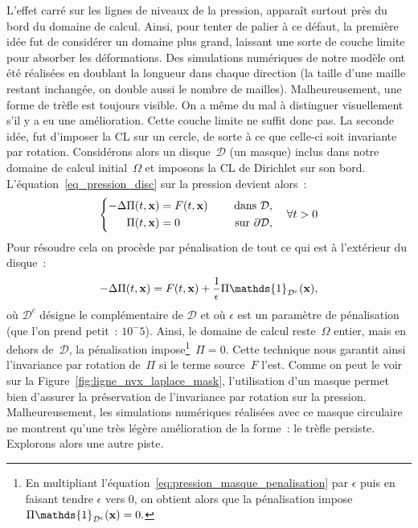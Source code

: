 \documentclass[main.tex]{subfiles}
\begin{document}
L'effet carré sur les lignes de niveaux de la pression, apparaît surtout près du bord du domaine de calcul. Ainsi, pour tenter de palier à ce défaut, la première idée fut de considérer un domaine plus grand, laissant une sorte de couche limite pour absorber les déformations. Des simulations numériques de notre modèle ont été réalisées en doublant la longueur dans chaque direction (la taille d'une maille restant inchangée, on double aussi le nombre de mailles). Malheureusement, une forme de trèfle est toujours visible. On a même du mal à distinguer visuellement s'il y a eu une amélioration. 
Cette couche limite ne suffit donc pas. 
La seconde idée, fut d'imposer la CL sur un cercle, de sorte à ce que celle-ci soit invariante par rotation. Considérons alors un disque~$\mathcal{D}$ (un masque) inclus dans notre domaine de calcul initial~$\Omega$ et imposons la CL de Dirichlet sur son bord. L'équation~\eqref{eq_pression_disc} sur la pression devient alors~: 
\begin{equation}\label{eq:pression_iter1_mask}
\left\{
\begin{aligned}
-\Delta \Pi(t,\mathbf{x}) &= F(t,\mathbf{x}) & \quad \textrm{ dans }  \mathcal{D} , \\
\Pi(t,\mathbf{x}) &=0 & \quad \textrm{ sur  } \partial\mathcal{D},
\end{aligned}
\right. \quad \forall t>0
\end{equation}
Pour résoudre cela on procède par pénalisation de tout ce qui est à l'extérieur du disque~:
\begin{equation}\label{eq:pression_masque_penalisation}
- \Delta \Pi(t,\vecx) = F(t,\vecx) + \frac{1}{\epsilon} \Pi \mathds{1}_{\mathcal{D}^c}(\vecx),
\end{equation}
où $\mathcal{D}^c$ désigne le complémentaire de $\mathcal{D}$ et où $\epsilon$ est un paramètre de pénalisation (que l'on prend petit~: $10^-5$). Ainsi, le domaine de calcul reste~$\Omega$ entier, mais en dehors de~$\mathcal{D}$, la pénalisation impose\footnote{En multipliant l'équation~\eqref{eq:pression_masque_penalisation} par $\epsilon$ puis en faisant tendre $\epsilon$ vers 0, on obtient alors que la pénalisation impose $\Pi \mathds{1}_{\mathcal{D}^c}(\vecx)=0.$}~$\Pi=0$. Cette technique nous garantit ainsi l'invariance par rotation de~$\Pi$ si le terme source~$F$ l'est. 
Comme on peut le voir sur la Figure~\ref{fig:ligne_nvx_laplace_mask}, l'utilisation d'un masque permet bien d'assurer la préservation de l'invariance par rotation sur la pression. Malheureusement, les simulations numériques réalisées avec ce masque circulaire ne montrent qu'une très légère amélioration 
de la forme~: le trèfle persiste. 
Explorons alors une autre piste. 
\end{document}
